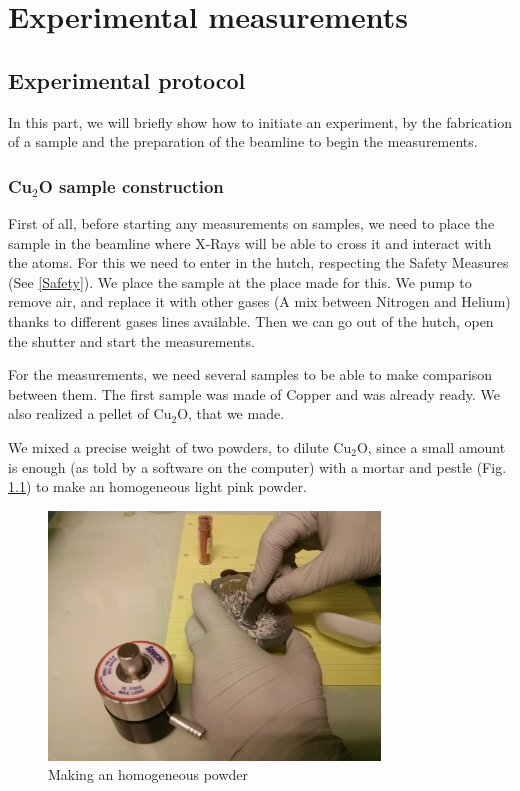 \documentclass[11pt,a4paper,oneside]{report}
\begin{document}
\newpage

\chapter{Experimental measurements}

\section{Experimental protocol}
In this part, we will briefly show how to initiate an experiment, by the fabrication of a sample and the preparation of the beamline to begin the measurements.


\subsection{Cu$_2$O sample construction}
First of all, before starting any measurements on samples, we need to place the sample in the beamline where X-Rays will be able to cross it and interact with the atoms. For this we need to enter in the hutch, respecting the Safety Measures (See \ref{Safety}). We place the sample at the place made for this. We pump to remove air, and replace it with other gases (A mix between Nitrogen and Helium) thanks to different gases lines available. Then we can go out of the hutch, open the shutter and start the measurements.

For the measurements, we need several samples to be able to make comparison between them. The first sample was made of Copper and was already ready. We also realized a pellet of Cu$_2$O, that we made.

 We mixed a precise weight of two powders, to dilute Cu$_2$O, since a small amount is enough (as told by a software on the computer) with a mortar and pestle (Fig. \ref{MixMortier}) to make an homogeneous light pink powder.

\begin{figure}[H]
    \centering
    \includegraphics[width=250pt]{Images/pellet1.jpg}
    \caption{Making an homogeneous powder}
    \label{MixMortier}
\end{figure}
\end{document}
